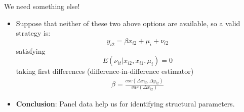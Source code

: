 \begin{frame}{We need something else!}
	\begin{itemize}
		\item Suppose that neither of these two above options are available, so a valid strategy is:
				$$y_{i2}=\beta x_{i2}+\mu _{i}+\nu _{i2}$$
			  satisfying
				$$E\left( \nu _{it}|x_{i2},x_{i1},\mu _{i}\right) =0$$
			  taking first differences (difference-in-difference estimator)%
				\begin{gather}
					\beta =\frac{cov\left( \Delta x_{i2},\Delta y_{i2}\right) }{var\left( \Delta x_{i2}\right)}
				\end{gather}
		\item \textbf{Conclusion}: Panel data help us for identifying structural parameters. \pause
	\end{itemize}
\end{frame}

